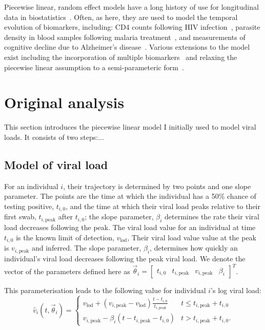 \documentclass[thesis.tex]{subfiles}
\begin{document}
Piecewise linear, random effect models have a long history of use for longitudinal data in biostatistics~\autocites{slateStatistical}.
Often, as here, they are used to model the temporal evolution of biomarkers, including:
CD4 counts following HIV infection~\autocites{langeHierarchical,lynchPredicting}, parasite density in
blood samples following malaria treatment~\autocites{fogartyBayesian}, and measurements
of cognitive decline due to Alzheimer's disease~\autocites{bealisleBayesian}.
Various extensions to the model exist including the incorporation of multiple biomarkers~\autocites{inoueModeling,giardinaGetting} and relaxing the piecewise linear assumption to a semi-parameteric form~\autocites{zegerSemiparametric}.

\section{Original analysis}

This section introduces the piecewise linear model I initially used to model viral loads.
It consists of two steps:...


\subsection{Model of viral load}

For an individual $i$, their trajectory is determined by two points and one slope parameter.
The points are the time at which the individual has a 50\% chance of testing positive, $t_{i,0}$, and the time at which their viral load peaks relative to their first swab, $t_{i,\text{peak}}$ after $t_{i,0}$; the slope parameter, $\beta_i$ determines the rate their viral load decreases following the peak.
The viral load value for an individual at time $t_{i,0}$ is the known limit of detection, $v_\text{lod}$,
Their viral load value value at the peak is $v_{i,\text{peak}}$ and inferred.
The slope parameter, $\beta_i$, determines how quickly an individual's viral load decreases following the peak viral load.
We denote the vector of the parameters defined here as $\vec\theta_i = \begin{bmatrix} t_{i,0} & t_{i,\text{peak}} & v_{i,\text{peak}} &  \beta_i \end{bmatrix}^T$.

This parameterisation leads to the following value for individual $i$'s log viral load:
$$
\hat{v}_i(t, \vec\theta_i) = \begin{cases}
  v_{\text{lod}} + (v_{i,\text{peak}} - v_{\text{lod}}) \frac{t - t_{i,0}}{t_{i,\text{peak}}}
    &t \leq t_{i,\text{peak}} + t_{i,0} \\
  v_{i,\text{peak}} - \beta_i (t - t_{i,\text{peak}} - t_{i,0})
    &t > t_{i,\text{peak}} + t_{i,0}.
\end{cases}
$$
\end{document}
